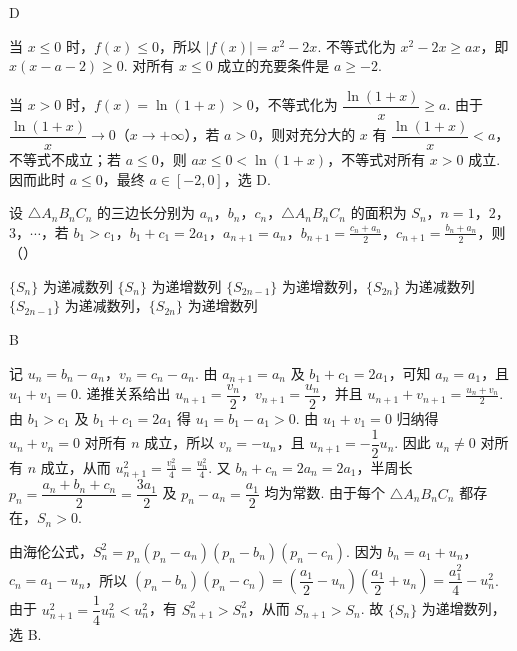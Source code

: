 \begin{answer}
D
\end{answer}

\begin{solution}
当 \(x\leqslant0\) 时，\(f(x)\leqslant0\)，所以 \(\lvert f(x)\rvert=x^2-2x\). 不等式化为
\(x^2-2x\geqslant ax\)，即 \(x(x-a-2)\geqslant0\). 对所有 \(x\leqslant0\) 成立的充要条件是 \(a\geqslant-2\).

当 \(x>0\) 时，\(f(x)=\ln(1+x)>0\)，不等式化为 \(\dfrac{\ln(1+x)}x\geqslant a\). 由于 \(\dfrac{\ln(1+x)}x\to0\)（\(x\to+\infty\)），若 \(a>0\)，则对充分大的 \(x\) 有 \(\dfrac{\ln(1+x)}x<a\)，不等式不成立；若 \(a\leqslant0\)，则 \(ax\leqslant0<\ln(1+x)\)，不等式对所有 \(x>0\) 成立. 因而此时 \(a\leqslant0\)，最终 \(a\in[-2,0]\)，选 D.
\end{solution}

\begin{problem}
设 \(\triangle A_{n}B_{n}C_{n}\) 的三边长分别为 \(a_{n}\)，\(b_{n}\)，\(c_{n}\)，\(\triangle A_{n}B_{n}C_{n}\) 的面积为 \(S_{n}\)，\(n = 1\)，\(2\)，\(3\)，\(\cdots\)，若 \(b_{1} > c_{1}\)，\(b_{1} + c_{1} = 2a_{1}\)，\(a_{n+1} = a_{n}\)，\(b_{n+1} = \frac{c_{n} + a_{n}}{2}\)，\(c_{n+1} = \frac{b_{n} + a_{n}}{2}\)，则（\quad）

\choices
    {\(\{S_{n}\}\) 为递减数列}
    {\(\{S_{n}\}\) 为递增数列}
    {\(\{S_{2n - 1}\}\) 为递增数列，\(\{S_{2n}\}\) 为递减数列}
    {\(\{S_{2n - 1}\}\) 为递减数列，\(\{S_{2n}\}\) 为递增数列}
\end{problem}

\begin{answer}
B
\end{answer}

\begin{solution}
记 \(u_n=b_n-a_n\)，\(v_n=c_n-a_n\). 由 \(a_{n+1}=a_n\) 及 \(b_1+c_1=2a_1\)，可知 \(a_n=a_1\)，且 \(u_1+v_1=0\). 递推关系给出
\(u_{n+1}=\dfrac{v_n}{2}\)，\(v_{n+1}=\dfrac{u_n}{2}\)，并且 \(u_{n+1}+v_{n+1}=\frac{u_n+v_n}{2}\).
由 \(b_1>c_1\) 及 \(b_1+c_1=2a_1\) 得 \(u_1=b_1-a_1>0\). 由 \(u_1+v_1=0\) 归纳得 \(u_n+v_n=0\) 对所有 \(n\) 成立，所以 \(v_n=-u_n\)，且 \(u_{n+1}=-\dfrac12u_n\). 因此 \(u_n\neq0\) 对所有 \(n\) 成立，从而
\(u_{n+1}^2=\frac{v_n^2}{4}=\frac{u_n^2}{4}\).
又 \(b_n+c_n=2a_n=2a_1\)，半周长 \(p_n=\dfrac{a_n+b_n+c_n}{2}=\dfrac{3a_1}{2}\) 及 \(p_n-a_n=\dfrac{a_1}{2}\) 均为常数. 由于每个 \(\triangle A_nB_nC_n\) 都存在，\(S_n>0\).

由海伦公式，\(S_n^2=p_n(p_n-a_n)(p_n-b_n)(p_n-c_n)\). 因为 \(b_n=a_1+u_n\)，\(c_n=a_1-u_n\)，所以
\((p_n-b_n)(p_n-c_n)=\left(\dfrac{a_1}{2}-u_n\right)\left(\dfrac{a_1}{2}+u_n\right)=\dfrac{a_1^2}{4}-u_n^2\). 由于 \(u_{n+1}^2=\dfrac14u_n^2<u_n^2\)，有 \(S_{n+1}^2>S_n^2\)，从而 \(S_{n+1}>S_n\). 故 \(\{S_n\}\) 为递增数列，选 B.
\end{solution}

